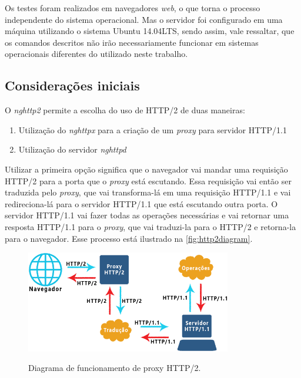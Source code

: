 Os testes foram realizados em navegadores \textit{web}, o que torna o processo independente do sistema operacional. Mas o servidor foi configurado em uma máquina utilizando o sistema Ubuntu 14.04LTS, sendo assim, vale ressaltar, que os comandos descritos não irão necessariamente funcionar em sistemas operacionais diferentes do utilizado neste trabalho.

\subsection{Considerações iniciais}
\label{consideracoesiniciais}

O \textit{nghttp2} permite a escolha do uso de HTTP/2 de duas maneiras:
\begin{enumerate}
	\item Utilização do \textit{nghttpx} para a criação de um \textit{proxy} para servidor HTTP/1.1
	\item Utilização do servidor \textit{nghttpd}
\end{enumerate}

Utilizar a primeira opção significa que o navegador vai mandar uma requisição HTTP/2 para a porta que o \textit{proxy} está escutando. Essa requisição vai então ser traduzida pelo \textit{proxy}, que vai transforma-lá em uma requisição HTTP/1.1 e vai redireciona-lá para o servidor HTTP/1.1 que está escutando outra porta. O servidor HTTP/1.1 vai fazer todas as operações necessárias e vai retornar uma resposta HTTP/1.1 para o \textit{proxy}, que vai traduzi-la para o HTTP/2 e retorna-la para o navegador. Esse processo está ilustrado na \autoref{fig:http2diagram}.

\begin{figure}[!htb]
    \centering
    \caption{Diagrama de funcionamento de proxy HTTP/2.}
    \includegraphics[width=0.8\textwidth]{./04-figuras/desenvolvimento/http2_proxy_diagram}
    \label{fig:http2diagram}
\end{figure}

